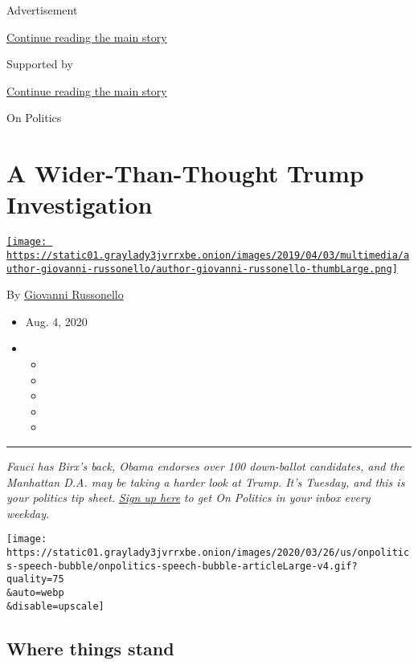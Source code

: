Advertisement

\protect\hyperlink{after-top}{Continue reading the main story}

Supported by

\protect\hyperlink{after-sponsor}{Continue reading the main story}

On Politics

\hypertarget{a-wider-than-thought-trump-investigation}{%
\section{A Wider-Than-Thought Trump
Investigation}\label{a-wider-than-thought-trump-investigation}}

\href{https://www.nytimes3xbfgragh.onion/by/giovanni-russonello}{\texttt{[image: https://static01.graylady3jvrrxbe.onion/images/2019/04/03/multimedia/author-giovanni-russonello/author-giovanni-russonello-thumbLarge.png]}}

By
\href{https://www.nytimes3xbfgragh.onion/by/giovanni-russonello}{Giovanni
Russonello}

\begin{itemize}
\item
  Aug. 4, 2020
\item
  \begin{itemize}
  \item
  \item
  \item
  \item
  \item
  \end{itemize}
\end{itemize}

\begin{center}\rule{0.5\linewidth}{\linethickness}\end{center}

\emph{Fauci has Birx's back, Obama endorses over 100 down-ballot
candidates, and the Manhattan D.A. may be taking a harder look at Trump.
It's Tuesday, and this is your politics tip sheet.}
\href{https://www.nytimes3xbfgragh.onion/newsletters/politics?module=inline}{\emph{Sign
up here}} \emph{to get On Politics in your inbox every weekday.}

\texttt{[image: https://static01.graylady3jvrrxbe.onion/images/2020/03/26/us/onpolitics-speech-bubble/onpolitics-speech-bubble-articleLarge-v4.gif?quality=75\\\&auto=webp\\\&disable=upscale]}

\hypertarget{where-things-stand}{%
\subsection{Where things stand}\label{where-things-stand}}

